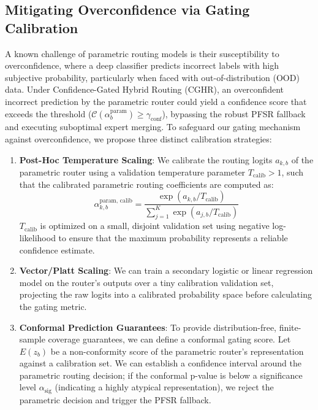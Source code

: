 \documentclass{article}
\theoremstyle{plain}
\theoremstyle{definition}
\theoremstyle{remark}
\begin{document}
\subsection{Mitigating Overconfidence via Gating Calibration}
A known challenge of parametric routing models is their susceptibility to overconfidence, where a deep classifier predicts incorrect labels with high subjective probability, particularly when faced with out-of-distribution (OOD) data. Under Confidence-Gated Hybrid Routing (CGHR), an overconfident incorrect prediction by the parametric router could yield a confidence score that exceeds the threshold ($\mathcal{C}(\alpha^{\text{param}}_b) \ge \gamma_{\text{conf}}$), bypassing the robust PFSR fallback and executing suboptimal expert merging. To safeguard our gating mechanism against overconfidence, we propose three distinct calibration strategies:
\begin{enumerate}
    \item \textbf{Post-Hoc Temperature Scaling}: We calibrate the routing logits $a_{k, b}$ of the parametric router using a validation temperature parameter $T_{\text{calib}} > 1$, such that the calibrated parametric routing coefficients are computed as:
    \begin{equation}
    \alpha^{\text{param, calib}}_{k, b} = \frac{\exp(a_{k, b} / T_{\text{calib}})}{\sum_{j=1}^K \exp(a_{j, b} / T_{\text{calib}})}
    \end{equation}
    $T_{\text{calib}}$ is optimized on a small, disjoint validation set using negative log-likelihood to ensure that the maximum probability represents a reliable confidence estimate.
    \item \textbf{Vector/Platt Scaling}: We can train a secondary logistic or linear regression model on the router's outputs over a tiny calibration validation set, projecting the raw logits into a calibrated probability space before calculating the gating metric.
    \item \textbf{Conformal Prediction Guarantees}: To provide distribution-free, finite-sample coverage guarantees, we can define a conformal gating score. Let $E(z_b)$ be a non-conformity score of the parametric router's representation against a calibration set. We can establish a confidence interval around the parametric routing decision; if the conformal p-value is below a significance level $\alpha_{\text{sig}}$ (indicating a highly atypical representation), we reject the parametric decision and trigger the PFSR fallback.
\end{enumerate}
\end{document}
